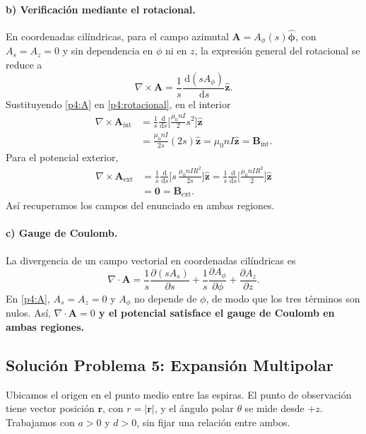 \documentclass[11pt]{article}
\newcommand{\dd}{\,\mathrm{d}}
\newcommand{\ez}{\hat{\mathbf{z}}}
\newcommand{\ep}{\hat{\boldsymbol{\phi}}}
\begin{document}
\paragraph{b) Verificación mediante el rotacional.}
En coordenadas cilíndricas, para el campo azimutal
$\mathbf A=A_\phi(s)\ep$, con $A_s=A_z=0$ y sin dependencia
en $\phi$ ni en $z$, la expresión general del rotacional se reduce a
\begin{equation}
  \nabla\times\mathbf A
    =\frac{1}{s}\frac{\dd(sA_\phi)}{\dd s}\ez.
  \label{p4:rotacional}
\end{equation}
Sustituyendo \eqref{p4:A} en \eqref{p4:rotacional}, en el interior
\begin{align*}
  \nabla\times\mathbf A_{\mathrm{int}}
    &=\frac{1}{s}\frac{\dd}{\dd s}
      \Biggl[\frac{\mu_0 nI}{2}s^2\Biggr]\ez\\
    &=\frac{\mu_0 nI}{2s}(2s)\ez
      =\mu_0 nI\ez
      =\mathbf B_{\mathrm{int}}.
\end{align*}
Para el potencial exterior,
\begin{align*}
  \nabla\times\mathbf A_{\mathrm{ext}}
    &=\frac{1}{s}\frac{\dd}{\dd s}
      \Biggl[s\,\frac{\mu_0 nIR^2}{2s}\Biggr]\ez
      =\frac{1}{s}\frac{\dd}{\dd s}
        \Biggl[\frac{\mu_0 nIR^2}{2}\Biggr]\ez\\
    &=\mathbf0
      =\mathbf B_{\mathrm{ext}}.
\end{align*}
Así recuperamos los campos del enunciado en ambas regiones.

\paragraph{c) Gauge de Coulomb.}
La divergencia de un campo vectorial en coordenadas cilíndricas es
\[
  \nabla\cdot\mathbf A
    =\frac{1}{s}\frac{\partial(sA_s)}{\partial s}
      +\frac{1}{s}\frac{\partial A_\phi}{\partial\phi}
      +\frac{\partial A_z}{\partial z}.
\]
En \eqref{p4:A}, $A_s=A_z=0$ y $A_\phi$ no depende de $\phi$,
de modo que los tres términos son nulos. Así,
\textbf{$\nabla\cdot\mathbf A=0$ y el potencial satisface el gauge
de Coulomb en ambas regiones.}

\clearpage
\subsection*{Solución Problema 5: Expansión Multipolar}

Ubicamos el origen en el punto medio entre las espiras. El punto
de observación tiene vector posición $\mathbf r$, con
$r=|\mathbf r|$, y el ángulo polar $\theta$ se mide desde $+z$.
Trabajamos con $a>0$ y $d>0$, sin fijar una relación entre ambos.
\end{document}
